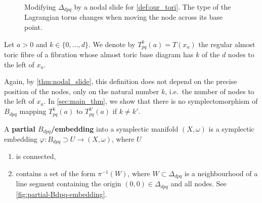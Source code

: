 \documentclass[12pt,a4paper,abstract=true,final]{scrartcl}
\begin{document}
\begin{figure}
  \centering
  \caption{Modifying $Δ_{dpq}$ by a nodal slide for \cref{def:our_tori}. The type of the Lagrangian torus changes when moving the node across its base point.}
  \label{fig:our_tori}
\end{figure}

\begin{definition}
  \label{def:our_tori}
    Let $a>0$ and $k \in \{0,\ldots,d\}$.
We denote by $T^k_{pq}(a) = T(x_a)$ the regular almost toric fibre of a fibration whose almost toric base diagram has $k$ of the $d$ nodes to the left of $x_a$. 
\end{definition}

Again, by \cref{thm:nodal_slide}, this definition does not depend on the precise position of the nodes, only on the natural number $k$, i.e.\ the number of nodes to the left of $x_a$.
In \cref{sec:main_thm}, we show that there is no symplectomorphism of $B_{dpq}$ mapping $T^k_{pq}(a)$ to $T^{k'}_{pq}(a)$ if $k \neq k'$.

\begin{definition}
    \label{def:partial_embedding}
    A \textbf{partial $B_{dpq}$\-/embedding} into a symplectic manifold $(X,\omega)$ is a symplectic embedding $φ\colon B_{dpq} ⊃ U → (X,ω)$, where $U$ 
    \begin{enumerate}
        \item is connected, 
        \item contains a set of the form $\pi^{-1}(W)$, where $W \subset \Delta_{dpq}$ is a neighbourhood of a line segment containing the origin $(0,0) \in \Delta_{dpq}$ and all nodes.
 See \cref{fig:partial-Bdpq-embedding}.   
    \end{enumerate}
\end{definition}
\end{document}
